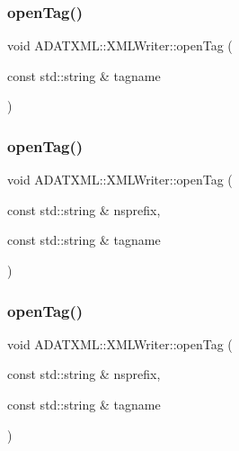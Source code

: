 \subsubsection{\texorpdfstring{openTag()}{openTag()}\hspace{0.1cm}{\footnotesize\ttfamily [2/8]}}
{\footnotesize\ttfamily void A\+D\+A\+T\+X\+M\+L\+::\+X\+M\+L\+Writer\+::open\+Tag (\begin{DoxyParamCaption}\item[{const std\+::string \&}]{tagname }\end{DoxyParamCaption})}

\mbox{\label{classADATXML_1_1XMLWriter_aa65d48238c4b08ebcedd534501e7cbaa}} 
\subsubsection{\texorpdfstring{openTag()}{openTag()}\hspace{0.1cm}{\footnotesize\ttfamily [3/8]}}
{\footnotesize\ttfamily void A\+D\+A\+T\+X\+M\+L\+::\+X\+M\+L\+Writer\+::open\+Tag (\begin{DoxyParamCaption}\item[{const std\+::string \&}]{nsprefix,  }\item[{const std\+::string \&}]{tagname }\end{DoxyParamCaption})}

\mbox{\label{classADATXML_1_1XMLWriter_aa65d48238c4b08ebcedd534501e7cbaa}} 
\subsubsection{\texorpdfstring{openTag()}{openTag()}\hspace{0.1cm}{\footnotesize\ttfamily [4/8]}}
{\footnotesize\ttfamily void A\+D\+A\+T\+X\+M\+L\+::\+X\+M\+L\+Writer\+::open\+Tag (\begin{DoxyParamCaption}\item[{const std\+::string \&}]{nsprefix,  }\item[{const std\+::string \&}]{tagname }\end{DoxyParamCaption})}


